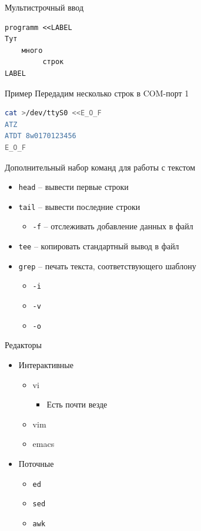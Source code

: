 \documentclass[ignorenonframetext, professionalfonts, hyperref={pdftex, unicode}]{beamer}
\begin{document}
\begin{frame}[fragile]{Мультистрочный ввод}

\begin{verbatim}
programm <<LABEL
Тут
    много
	     строк
LABEL
\end{verbatim}

	\pause
	\begin{block}{Пример}
	Передадим несколько строк в COM-порт 1
\begin{lstlisting}[language=bash]
cat >/dev/ttyS0 <<E_O_F
ATZ
ATDT 8w0170123456
E_O_F
\end{lstlisting}
	\end{block}
\end{frame}

\begin{frame}{Дополнительный набор команд для работы с текстом}
	\begin{itemize}
	  \item {\tt head} -- вывести первые строки
	  \item {\tt tail} -- вывести последние строки
		\begin{itemize}
			\item {\tt -f} -- отслеживать добавление данных в файл 
		\end{itemize}
	  \item {\tt tee} -- копировать стандартный вывод в файл
	  \item {\tt grep} -- печать текста, соответствующего шаблону
		\begin{itemize}
			\item {\tt -i}	
			\item {\tt -v}
			\item {\tt -o}
		\end{itemize}
	\end{itemize}
\end{frame}

\begin{frame}{Редакторы}
\begin{itemize}
 \item Интерактивные
 \begin{itemize}
 \item vi
   \begin{itemize}
    \item Есть почти везде
   \end{itemize}
 \item vim
 \item emacs
 \end{itemize}
 \item Поточные
	 \begin{itemize}
		 \item {\tt ed}
		 \item {\tt sed}
		 \item {\tt awk}
	\end{itemize}
 \end{itemize}
\end{frame}
\end{document}
